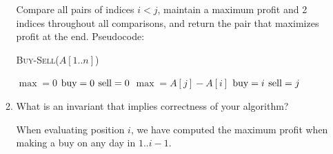\documentclass[letterpaper,11pt]{article}
\begin{document}
\begin{enumerate}
\begin{enumerate}
Compare all pairs of indices $i < j$, maintain a maximum profit and 2 indices throughout all comparisons, and return the pair that maximizes profit at the end. Pseudocode:

%

\newcommand{\buy}[0]{\ensuremath\textrm{buy}}
\newcommand{\sell}[0]{\ensuremath\textrm{sell}}

\begin{algorithm}[!h]
\textsc{Buy-Sell}($A[1..n]$)
\begin{algorithmic}[1]
\State $\max = 0$
\State $\buy = 0$
\State $\sell = 0$
\State       $\max = A[j] - A[i]$
\State       $\buy = i$
\State       $\sell = j$
        \EndIf
    \EndFor
\EndFor
\State \Return{$(\buy,\sell)$}
\end{algorithmic}
\end{algorithm}

\newpage
\vspace*{0.27cm}
\item What is an invariant that implies correctness of your algorithm?

When evaluating position $i$, we have computed the maximum profit when making a buy on any day in $1..i-1$.


\end{enumerate}
\end{enumerate}
\end{document}
